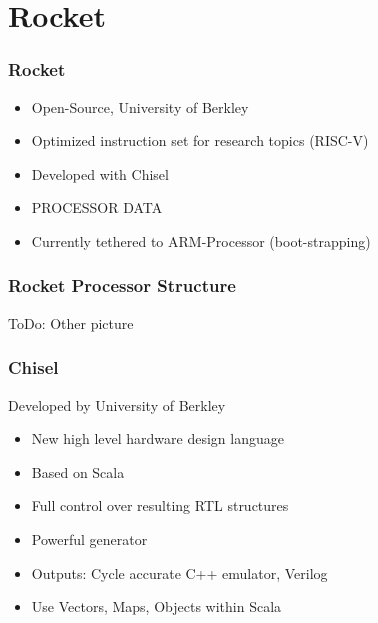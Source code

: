 \documentclass{beamer}
\begin{document}
\section{Rocket}
\begin{frame}
	\frametitle{Rocket}
	\begin{itemize}
		\item Open-Source, University of Berkley
		\item Optimized instruction set for research topics (RISC-V)
		\item Developed with Chisel
		\item PROCESSOR DATA
		\item Currently tethered to ARM-Processor (boot-strapping)
	\end{itemize}
\end{frame}

\begin{frame}
	\frametitle{Rocket Processor Structure}
	ToDo: Other picture
	\begin{figure}[!h]
	\begin{center}
	\end{center}
	\end{figure}
\end{frame}

\begin{frame}
	\frametitle{Chisel}
	Developed by University of Berkley
	\begin{itemize}
		\item New high level hardware design language
		\item Based on Scala
		\item Full control over resulting RTL structures
		\item Powerful generator %
		\item Outputs: Cycle accurate C++ emulator, Verilog
		\item Use Vectors, Maps, Objects within Scala
	\end{itemize}
\end{frame}
\end{document}
